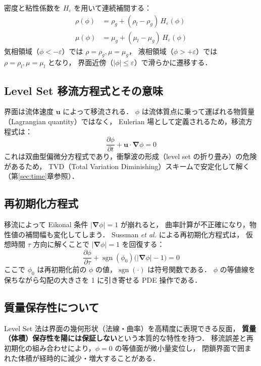 \documentclass[12pt, a4paper, titlepage]{article}
\newcommand{\jp}[1]{{\normalfont\jpfont #1}}
\newcommand{\pd}[2]{\dfrac{\partial #1}{\partial #2}}
\newcommand{\bu}{\bm{u}}
\newcommand{\bnabla}{\bm{\nabla}}
\newcommand{\He}{H_\varepsilon}
\begin{document}
\jp{密度と粘性係数を $\He$ を用いて連続補間する：}
\begin{align}
  \rho(\phi) &= \rho_g + (\rho_l - \rho_g)\,\He(\phi)
  \label{eq:rho_interp}\\
  \mu(\phi)  &= \mu_g  + (\mu_l  - \mu_g )\,\He(\phi)
  \label{eq:mu_interp}
\end{align}
\jp{気相領域（$\phi<-\varepsilon$）では $\rho=\rho_g, \mu=\mu_g$，
液相領域（$\phi>+\varepsilon$）では $\rho=\rho_l, \mu=\mu_l$ となり，
界面近傍（$|\phi|\le\varepsilon$）で滑らかに遷移する．}

\subsection{Level Set \jp{移流方程式とその意味}}

\jp{界面は流体速度 $\bu$ によって移流される．
$\phi$ は流体質点に乗って運ばれる物質量（Lagrangian quantity）ではなく，
Eulerian 場として定義されるため，移流方程式は：}
\begin{equation}
  \pd{\phi}{t} + \bu \cdot \bnabla\phi = 0
  \label{eq:levelset_adv}
\end{equation}
\jp{これは双曲型偏微分方程式であり，衝撃波の形成（level set の折り畳み）の危険があるため，
TVD（Total Variation Diminishing）スキームで安定化して解く（第\ref{sec:time}章参照）．}

\subsection{\jp{再初期化方程式}}
\label{sec:reinit}

\jp{移流によって Eikonal 条件 $|\bnabla\phi|=1$ が崩れると，
曲率計算が不正確になり，物性値の補間幅も変化してしまう．
Sussman \textit{et al.} \cite{Sussman1994} による再初期化方程式は，
仮想時間 $\tau$ 方向に解くことで $|\bnabla\phi|=1$ を回復する：}
\begin{equation}
  \pd{\phi}{\tau} + \operatorname{sgn}(\phi_0)\bigl(|\bnabla\phi| - 1\bigr) = 0
  \label{eq:reinit}
\end{equation}
\jp{ここで $\phi_0$ は再初期化前の $\phi$ の値，$\operatorname{sgn}(\cdot)$ は符号関数である．
$\phi$ の等値線を保ちながら勾配の大きさを 1 に引き寄せる PDE 操作である．}

\subsection{\jp{質量保存性について}}
\label{sec:massconserv}

\jp{Level Set 法は界面の幾何形状（法線・曲率）を高精度に表現できる反面，
\textbf{質量（体積）保存性を陽には保証しない}という本質的な特性を持つ．
移流誤差と再初期化の組み合わせにより，$\phi=0$ の等値面が微小量変位し，
閉鎖界面で囲まれた体積が経時的に減少・増大することがある．}
\end{document}
